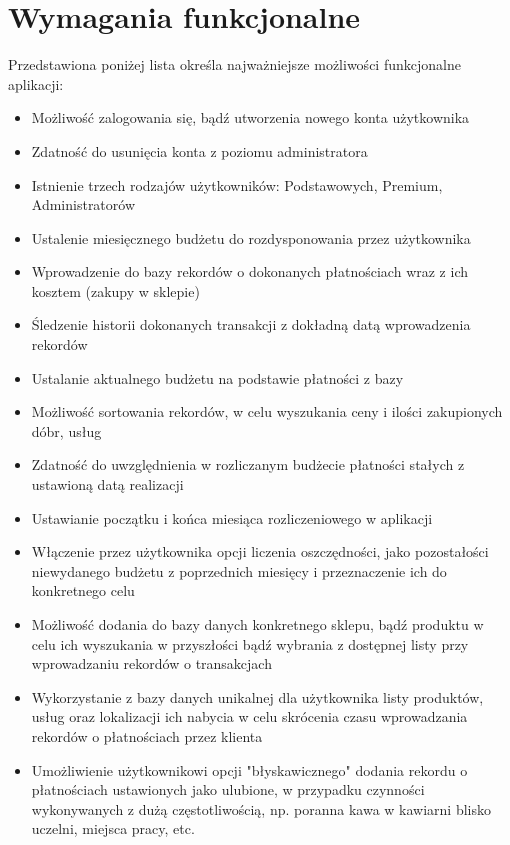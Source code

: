 \documentclass{article}
\begin{document}
    \section{Wymagania funkcjonalne}
    Przedstawiona poniżej lista określa najważniejsze możliwości funkcjonalne aplikacji:
    \begin{itemize}
    \item Możliwość zalogowania się, bądź utworzenia nowego konta użytkownika
    \item Zdatność do usunięcia konta z poziomu administratora
    \item Istnienie trzech rodzajów użytkowników: Podstawowych, Premium, Administratorów
    \item Ustalenie miesięcznego budżetu do rozdysponowania przez użytkownika
    \item Wprowadzenie do bazy rekordów o dokonanych płatnościach wraz z ich kosztem (zakupy w sklepie)
    \item Śledzenie historii dokonanych transakcji z dokładną datą wprowadzenia rekordów
    \item Ustalanie aktualnego budżetu na podstawie płatności z bazy
    \item Możliwość sortowania rekordów, w celu wyszukania ceny i ilości zakupionych dóbr, usług
    \item Zdatność do uwzględnienia w rozliczanym budżecie płatności stałych z ustawioną datą realizacji
    \item Ustawianie początku i końca miesiąca rozliczeniowego w aplikacji
    \item Włączenie przez użytkownika opcji liczenia oszczędności, jako pozostałości niewydanego budżetu z poprzednich miesięcy i przeznaczenie ich do konkretnego celu
    \item Możliwość dodania do bazy danych konkretnego sklepu, bądź produktu w celu ich wyszukania w przyszłości bądź wybrania z dostępnej listy przy wprowadzaniu rekordów o transakcjach
    \item Wykorzystanie z bazy danych unikalnej dla użytkownika listy produktów, usług oraz lokalizacji ich nabycia w celu skrócenia czasu wprowadzania rekordów o płatnościach przez klienta
    \item Umożliwienie użytkownikowi opcji "błyskawicznego" dodania rekordu o płatnościach ustawionych jako ulubione, w przypadku czynności wykonywanych z dużą częstotliwością, np. poranna kawa w kawiarni blisko uczelni, miejsca pracy, etc.
    \end{itemize}
    
\end{document}
